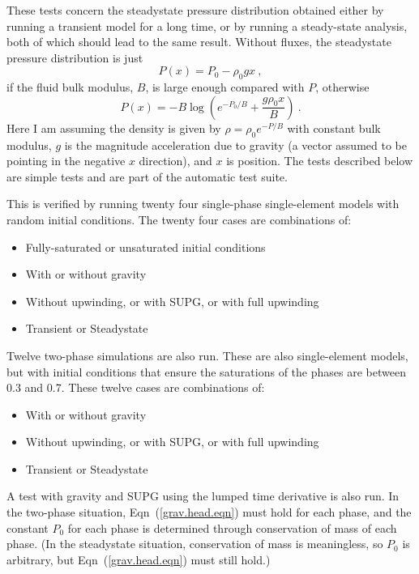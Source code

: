 \documentclass[]{scrreprt}
\begin{document}
These tests concern the steadystate pressure distribution obtained
either by running a transient model for a long time, or by running a
steady-state analysis, both of which should lead to the same result.
Without fluxes, the steadystate pressure distribution is just
\begin{equation}
P(x) = P_{0} - \rho_{0} g x \ ,
\end{equation}
if the fluid bulk modulus, $B$, is large enough compared with $P$, otherwise
\begin{equation}
P(x) = -B \log\left( e^{-P_{0}/B} + \frac{g\rho_{0}x}{B} \right) \ .
\label{grav.head.eqn}
\end{equation}
Here I am assuming the density is given by $\rho = \rho_{0}e^{-P/B}$
with constant bulk modulus, $g$ is the
magnitude acceleration due to gravity (a vector assumed to be pointing in the
negative $x$ direction), and $x$ is position.  The tests described below
are simple tests and are part of the automatic test suite.

This is verified by running twenty four single-phase single-element models
with random initial conditions.  The twenty four cases are combinations of:
\begin{itemize}
\item Fully-saturated or unsaturated initial conditions
\item With or without gravity
\item Without upwinding, or with SUPG, or with full upwinding
\item Transient or Steadystate
\end{itemize}
Twelve two-phase simulations are also run.  These are also
single-element models, but with initial conditions that ensure the
saturations of the phases are between 0.3 and 0.7.  These twelve cases
are combinations of:
\begin{itemize}
\item With or without gravity
\item Without upwinding, or with SUPG, or with full upwinding
\item Transient or Steadystate
\end{itemize}
A test with gravity and SUPG using the lumped time derivative is also run.
In the two-phase situation, Eqn~(\ref{grav.head.eqn}) must hold for
each phase, and the constant $P_{0}$ for each phase is determined
through conservation of mass of each phase.  (In the steadystate
situation, conservation of mass is meaningless, so $P_{0}$ is
arbitrary, but Eqn~(\ref{grav.head.eqn}) must still hold.)
\end{document}
